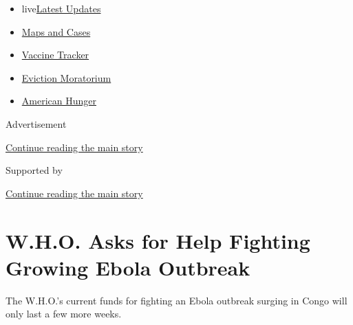 \begin{itemize}
\tightlist
\item
  live\href{https://www.nytimes3xbfgragh.onion/2020/09/08/world/covid-19-coronavirus.html?name=styln-coronavirus-national\&region=TOP_BANNER\&block=storyline_menu_recirc\&action=click\&pgtype=Article\&impression_id=b95ccf10-f1ea-11ea-a70e-33eec3aac5bb\&variant=undefined}{Latest
  Updates}
\item
  \href{https://www.nytimes3xbfgragh.onion/interactive/2020/us/coronavirus-us-cases.html?name=styln-coronavirus-national\&region=TOP_BANNER\&block=storyline_menu_recirc\&action=click\&pgtype=Article\&impression_id=b95ccf11-f1ea-11ea-a70e-33eec3aac5bb\&variant=undefined}{Maps
  and Cases}
\item
  \href{https://www.nytimes3xbfgragh.onion/interactive/2020/science/coronavirus-vaccine-tracker.html?name=styln-coronavirus-national\&region=TOP_BANNER\&block=storyline_menu_recirc\&action=click\&pgtype=Article\&impression_id=b95ccf12-f1ea-11ea-a70e-33eec3aac5bb\&variant=undefined}{Vaccine
  Tracker}
\item
  \href{https://www.nytimes3xbfgragh.onion/2020/09/02/your-money/eviction-moratorium-covid.html?name=styln-coronavirus-national\&region=TOP_BANNER\&block=storyline_menu_recirc\&action=click\&pgtype=Article\&impression_id=b95ccf13-f1ea-11ea-a70e-33eec3aac5bb\&variant=undefined}{Eviction
  Moratorium}
\item
  \href{https://www.nytimes3xbfgragh.onion/interactive/2020/09/02/magazine/food-insecurity-hunger-us.html?name=styln-coronavirus-national\&region=TOP_BANNER\&block=storyline_menu_recirc\&action=click\&pgtype=Article\&impression_id=b95cf620-f1ea-11ea-a70e-33eec3aac5bb\&variant=undefined}{American
  Hunger}
\end{itemize}

Advertisement

\protect\hyperlink{after-top}{Continue reading the main story}

Supported by

\protect\hyperlink{after-sponsor}{Continue reading the main story}

\hypertarget{who-asks-for-help-fighting-growing-ebola-outbreak}{%
\section{W.H.O. Asks for Help Fighting Growing Ebola
Outbreak}\label{who-asks-for-help-fighting-growing-ebola-outbreak}}

The W.H.O.'s current funds for fighting an Ebola outbreak surging in
Congo will only last a few more weeks.

